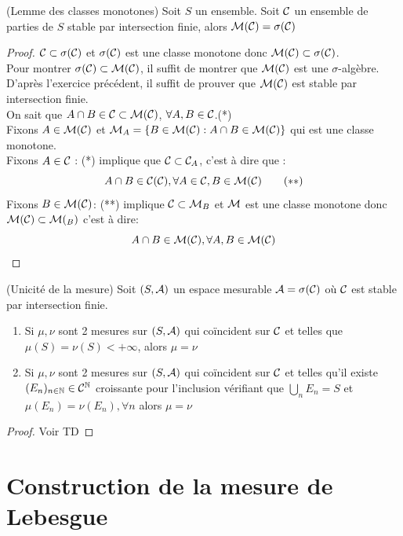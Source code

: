 \documentclass[]{report}
\begin{document}
    \begin{lm}{}{(Lemme des classes monotones)}
        Soit $S$ un ensemble. Soit $\mathcal{C}$ un ensemble de parties de $S$ stable par intersection finie, alors $\mathcal{M}(\mathcal{C})=\sigma(\mathcal{C})$
    \end{lm}

    \begin{proof}{}{}
        $\mathcal{C}\subset\sigma(\mathcal{C})$ et $\sigma(\mathcal{C})$ est une classe monotone donc $\mathcal{M}(\mathcal{C})\subset\sigma(\mathcal{C})$.\\
        Pour montrer $\sigma(\mathcal{C})\subset\mathcal{M}(\mathcal{C})$, il suffit de montrer que $\mathcal{M}(\mathcal{C})$ est une $\sigma$-algèbre. D'après l'exercice précédent, il suffit de prouver que $\mathcal{M}(\mathcal{C})$ est stable par intersection finie.\\
        On sait que $A\cap B\in\mathcal{C}\subset\mathcal{M}(\mathcal{C})$, $\forall A,B\in\mathcal{C}$.\qquad (*)\\
        Fixons $A\in\mathcal{M}(\mathcal{C})$ et $\mathcal{M}_A=\{B\in\mathcal{M}(\mathcal{C}):A\cap B\in\mathcal{M}(\mathcal{C})\}$ qui est une classe monotone.\\
        Fixons $A\in\mathcal{C}$ : (*) implique que $\mathcal{C}\subset\mathcal{C}_A$, c'est à dire que :
        \[A\cap B\in\mathcal{C}(\mathcal{C}),\forall A\in\mathcal{C},B\in\mathcal{M}(\mathcal{C})\qquad (**)\]
        Fixons $B\in\mathcal{M}(\mathcal{C})$: (**) implique $\mathcal{C}\subset \mathcal{M}_B$ et $\mathcal{M}$ est une classe monotone donc $\mathcal{M}(\mathcal{C})\subset\mathcal{M}(_B)$ c'est à dire:
        \[A\cap B\in\mathcal{M}(\mathcal{C}),\forall A,B\in\mathcal{M}(\mathcal{C})\]
    \end{proof}

    \begin{cor}{}{(Unicité de la mesure)}
        Soit $(S,\mathcal{A})$ un espace mesurable \tq $\mathcal{A}=\sigma(\mathcal{C})$ où $\mathcal{C}$ est stable par intersection finie.
        \begin{enumerate}
            \item Si $\mu,\nu$ sont 2 mesures sur $(S,\mathcal{A})$ qui coïncident sur $\mathcal{C}$ et telles que $\mu(S)=\nu(S)<+\infty$, alors $\mu=\nu$
            \item Si $\mu,\nu$ sont 2 mesures sur $(S,\mathcal{A})$ qui coïncident sur $\mathcal{C}$ et telles qu'il existe $(E_n)_{n\in\mathbb{N}}\in\mathcal{C}^{\mathbb{N}}$ croissante pour l'inclusion vérifiant que $\bigcup_n E_n=S$ et $\mu(E_n)=\nu(E_n),\forall n$ alors $\mu=\nu$
        \end{enumerate}
    \end{cor}

    \begin{proof}{}{}
        Voir TD
    \end{proof}

    \section{Construction de la mesure de Lebesgue}
\end{document}
